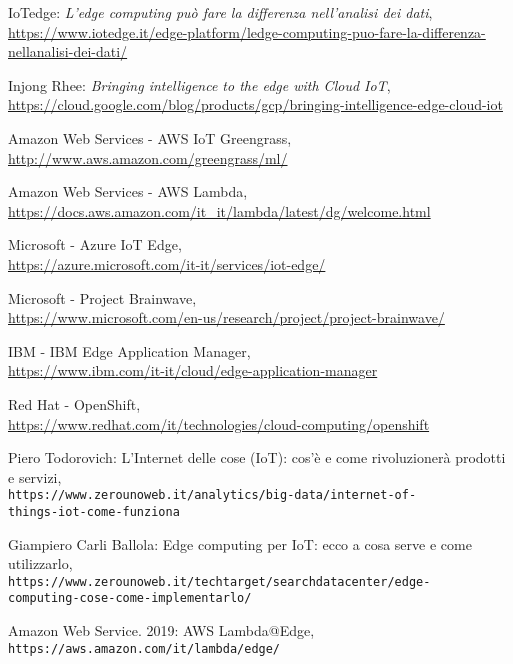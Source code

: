 \documentclass[a4paper,12pt,oneside]{book}
\begin{document}
\begin{thebibliography}{9}
	
	IoTedge: \textit{L’edge computing può fare la differenza nell’analisi dei dati},
	\url{https://www.iotedge.it/edge-platform/ledge-computing-puo-fare-la-differenza-nellanalisi-dei-dati/}
	
	Injong Rhee: \textit{Bringing intelligence to the edge with Cloud IoT},
	\\\url{https://cloud.google.com/blog/products/gcp/bringing-intelligence-edge-cloud-iot}
	
	Amazon Web Services - AWS IoT Greengrass,
	\\\url{http://www.aws.amazon.com/greengrass/ml/}
	
	Amazon Web Services - AWS Lambda,
	\\\url{https://docs.aws.amazon.com/it_it/lambda/latest/dg/welcome.html}
	
	Microsoft - Azure IoT Edge,
	\\\url{https://azure.microsoft.com/it-it/services/iot-edge/}
	
	Microsoft - Project Brainwave,
	\\\url{https://www.microsoft.com/en-us/research/project/project-brainwave/}
	
	IBM - IBM Edge Application Manager,
	\\\url{https://www.ibm.com/it-it/cloud/edge-application-manager}
	
	Red Hat - OpenShift,
	\\\url{https://www.redhat.com/it/technologies/cloud-computing/openshift}
	
	
	
	
	Piero Todorovich: L’Internet delle cose (IoT): cos’è e come rivoluzionerà prodotti e servizi,
	\\\texttt{https://www.zerounoweb.it/analytics/big-data/internet-of-\\things-iot-come-funziona}
	
	Giampiero Carli Ballola: Edge computing per IoT: ecco a cosa serve e come utilizzarlo,
	\\\texttt{https://www.zerounoweb.it/techtarget/searchdatacenter/edge-\\computing-cose-come-implementarlo/}
		
	Amazon Web Service. 2019: AWS Lambda@Edge,
	\\\texttt{https://aws.amazon.com/it/lambda/edge/}
	

\end{thebibliography}
\end{document}
